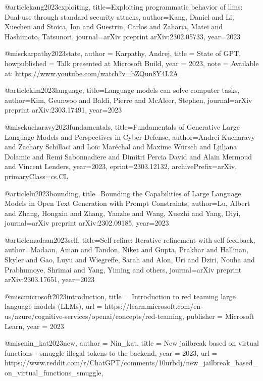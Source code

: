 @article{kang2023exploiting,
  title={Exploiting programmatic behavior of llms: Dual-use through standard security attacks},
  author={Kang, Daniel and Li, Xuechen and Stoica, Ion and Guestrin, Carlos and Zaharia, Matei and Hashimoto, Tatsunori},
  journal={arXiv preprint arXiv:2302.05733},
  year={2023}
}

@misc{karpathy2023state,
  author = {Karpathy, Andrej},
  title = {State of GPT},
  howpublished = {Talk presented at Microsoft Build},
  year = {2023},
  note = {Available at: \url{https://www.youtube.com/watch?v=bZQun8Y4L2A}}
}

@article{kim2023language,
  title={Language models can solve computer tasks},
  author={Kim, Geunwoo and Baldi, Pierre and McAleer, Stephen},
  journal={arXiv preprint arXiv:2303.17491},
  year={2023}
}

@misc{kucharavy2023fundamentals,
      title={Fundamentals of Generative Large Language Models and Perspectives in Cyber-Defense},
      author={Andrei Kucharavy and Zachary Schillaci and Loïc Maréchal and Maxime Würsch and Ljiljana Dolamic and Remi Sabonnadiere and Dimitri Percia David and Alain Mermoud and Vincent Lenders},
      year={2023},
      eprint={2303.12132},
      archivePrefix={arXiv},
      primaryClass={cs.CL}
}

@article{lu2023bounding,
  title={Bounding the Capabilities of Large Language Models in Open Text Generation with Prompt Constraints},
  author={Lu, Albert and Zhang, Hongxin and Zhang, Yanzhe and Wang, Xuezhi and Yang, Diyi},
  journal={arXiv preprint arXiv:2302.09185},
  year={2023}
}

@article{madaan2023self,
  title={Self-refine: Iterative refinement with self-feedback},
  author={Madaan, Aman and Tandon, Niket and Gupta, Prakhar and Hallinan, Skyler and Gao, Luyu and Wiegreffe, Sarah and Alon, Uri and Dziri, Nouha and Prabhumoye, Shrimai and Yang, Yiming and others},
  journal={arXiv preprint arXiv:2303.17651},
  year={2023}
}

@misc{microsoft2023introduction,
  title = {Introduction to red teaming large language models (LLMs)},
  url = {https://learn.microsoft.com/en-us/azure/cognitive-services/openai/concepts/red-teaming},
  publisher = {Microsoft Learn},
  year = {2023}
}

@misc{nin_kat2023new,
    author = {Nin_kat},
    title = {New jailbreak based on virtual functions - smuggle illegal tokens to the backend},
    year = {2023},
    url = {https://www.reddit.com/r/ChatGPT/comments/10urbdj/new_jailbreak_based_on_virtual_functions_smuggle},
}

